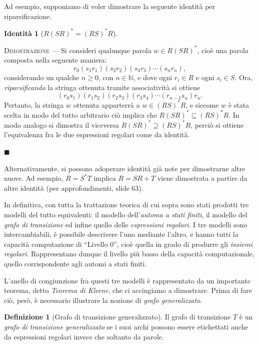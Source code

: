 \documentclass[10pt]{\classname}
\theoremstyle{definition}
\newtheorem{definizione}{Definizione}[section]
\theoremstyle{definition}
\theoremstyle{definition}
\newtheorem{identita}{Identità}[section]
\theoremstyle{definition}
\begin{document}
\clearpage

Ad esempio, supponiamo di voler dimostrare la seguente identità per riparsificazione.

\begin{identita}[$R(SR)^* = (RS)^* R$]
\end{identita}

\textsc{Dimostrazione } --- Si consideri qualunque parola $w \in R(SR)^*$, cioè
una parola composta nella seguente maniera:
$$r_0(s_1r_1)(s_2r_2)(s_3r_3)\cdots(s_nr_n),$$ considerando un qualche $n \geq
0$, con $n \in \mathbb{N}$, e dove ogni $r_i \in R$ e ogni $s_i \in S$. Ora,
\emph{riparsificando} la stringa ottenuta tramite associatività si ottiene
$$(r_0s_1)(r_1s_2)(r_2s_3)(r_3s_4)\cdots(r_{n-1}s_n)r_n.$$ Pertanto, la stringa
$w$ ottenuta apparterrà a $w \in (RS)^*R$, e siccome $w$ è stata scelta in modo
del tutto arbitrario ciò implica che $R(SR)^* \subseteq (RS)^* R$. In modo
analogo si dimostra il viceversa $R(SR)^* \supseteq (RS)^* R$, perciò si
ottiene l'equivalenza fra le due espressioni regolari come da identità.

\begin{flushright}
$\blacksquare$
\end{flushright}

Alternativamente, si possono adoperare identità già note per dimostrarne altre
nuove. Ad esempio, $R = S^* T$ implica $R = SR + T$ viene dimostrata a partire
da altre identità (per approfondimenti, slide 63).

In definitiva, con tutta la trattazione teorica di cui sopra sono stati
prodotti tre modelli del tutto equivalenti: il modello dell'\emph{automa a
stati finiti}, il modello del \emph{grafo di transizione} ed infine quello
delle \emph{espressioni regolari}. I tre modelli sono intercambiabili, è
possibile descrivere l'uno mediante l'altro, e hanno tutti la capacità
computazione di ``Livello 0'', cioè quella in grado di produrre gli \emph{insiemi
regolari}. Rappresentano dunque il livello più basso della capacità
computazionale, quello corrispondente agli automi a stati finiti.

L'anello di congiunzione fra questi tre modelli è rappresentato da un
importante teorema, detto \emph{Teorema di Kleene}, che ci accingiamo a
dimostrare. Prima di fare ciò, però, è necessario illustrare la nozione di
\emph{grafo generalizzato}.

\begin{definizione}[Grafo di transizione generalizzato]
    Il grafo di transizione $T$ è un \emph{grafo di transizione generalizzato} se i suoi archi possono essere
    etichettati anche da espressioni regolari invece che soltanto da parole.
\end{definizione}
\end{document}
